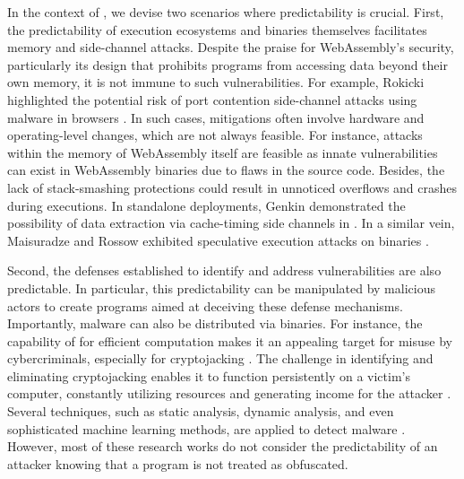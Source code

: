 
In the context of \Wasm, we devise two scenarios where predictability is crucial.
First, the predictability of execution ecosystems and \Wasm binaries themselves facilitates memory and side-channel attacks.
Despite the praise for WebAssembly's security, particularly its design that prohibits programs from accessing data beyond their own memory, it is not immune to such vulnerabilities. 
For example, Rokicki \etal highlighted the potential risk of port contention side-channel attacks using \Wasm malware in browsers \cite{10.1145/3488932.3517411}. 
In such cases, mitigations often involve hardware and operating-level changes, which are not always feasible.
For instance, attacks within the memory of WebAssembly itself are feasible\cite{usenixWasm2020} as innate vulnerabilities can exist in WebAssembly binaries due to flaws in the source code. 
Besides, the lack of stack-smashing protections could result in unnoticed overflows and crashes during \Wasm executions\cite{DeRoover2022}. 
In standalone deployments, Genkin \etal demonstrated the possibility of data extraction via cache-timing side channels in \Wasm \cite{Genkin2018DrivebyKC}. 
In a similar vein, Maisuradze and Rossow exhibited speculative execution attacks on \Wasm binaries \cite{ret2spec}.


Second, the defenses established to identify and address vulnerabilities are also predictable. 
In particular, this predictability can be manipulated by malicious actors to create programs aimed at deceiving these defense mechanisms. 
Importantly, malware can also be distributed via \Wasm binaries. 
For instance, the capability of \Wasm for efficient computation makes it an appealing target for misuse by cybercriminals, especially for cryptojacking \cite{10.1145/3339252.3339261}. 
The challenge in identifying and eliminating cryptojacking enables it to function persistently on a victim's computer, constantly utilizing resources and generating income for the attacker \cite{9566204}.  
Several techniques, such as static analysis, dynamic analysis, and even sophisticated machine learning methods, are applied to detect \Wasm malware \cite{Minesweeper,MinerRay,MINOS,SEISMIC,RAPID,Outguard}. 
However, most of these research works do not consider the predictability of an attacker knowing that a \Wasm program is not treated as obfuscated.





